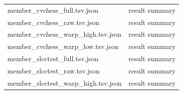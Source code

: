 \begin{longtable}{>{\raggedright\arraybackslash}p{.49\linewidth}>{\raggedright\arraybackslash}p{.44\linewidth}}
member\_\allowbreak{}cvchess\_\allowbreak{}full.tsv.json & %
result summary \\ %

member\_\allowbreak{}cvchess\_\allowbreak{}raw.tsv.json & %
result summary \\ %

member\_\allowbreak{}cvchess\_\allowbreak{}warp\_\allowbreak{}high.tsv.json & %
result summary \\ %

member\_\allowbreak{}cvchess\_\allowbreak{}warp\_\allowbreak{}low.tsv.json & %
result summary \\ %

member\_\allowbreak{}slcctest\_\allowbreak{}full.tsv.json & %
result summary \\ %

member\_\allowbreak{}slcctest\_\allowbreak{}raw.tsv.json & %
result summary \\ %

member\_\allowbreak{}slcctest\_\allowbreak{}warp\_\allowbreak{}high.tsv.json & %
result summary \\ %


\end{longtable}
